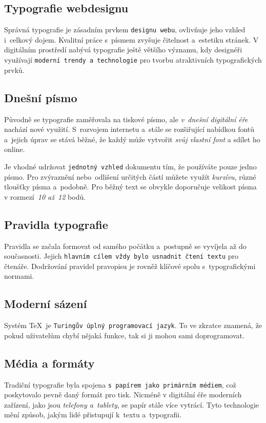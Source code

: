 \documentclass[a4paper, 11pt]{article}
\begin{document}
\subsection{Typografie webdesignu}
Správná typografie je zásadním prvkem \texttt{designu webu}, ovlivňuje jeho vzhled i~celkový dojem. Kvalitní práce s~písmem zvyšuje čitelnost a~estetiku stránek. V digitálním prostředí nabývá typografie ještě většího významu, kdy designéři využívají \texttt{moderní trendy a~technologie} pro tvorbu atraktivních typografických prvků.\cite{FinkoTypografieWebdesign}

\subsection{Dnešní písmo}
Původně se typografie zaměřovala na tiskové písmo, ale \emph{v~dnešní digitální éře} nachází nové využití. S~rozvojem internetu a~stále se rozšiřující nabídkou fontů a~jejich úprav se stává běžné, že každý může vytvořit \emph{svůj vlastní font} a sdílet ho online.\cite{Nova2018}

Je vhodné udržovat \texttt{jednotný vzhled} dokumentu tím, že používáte pouze jedno písmo. Pro zvýraznění nebo~odlišení určitých částí můžete využít \emph{kurzívu}, různé tloušťky písma a~podobně. Pro běžný text se obvykle doporučuje velikost písma v rozmezí~\emph{10 až~12} bodů.\cite{FriesenPat2010TPoT}


\subsection{Pravidla typografie}
Pravidla se začala formovat od samého počátku a~postupně se vyvíjela až do současnosti. Jejich \texttt{hlavním cílem vždy bylo usnadnit čtení textu} pro čtenáře. Dodržování pravidel pravopisu je rovněž klíčové spolu s~typografickými normami.\cite{StudijniOporaTypografie2012}

\subsection{Moderní sázení}
Systém \TeX~je \texttt{Turingův úplný programovací jazyk}. To ve zkratce znamená, že pokud uživatelům chybí nějaká funkce, tak si ji mohou sami doprogramovat.\cite{SyropoulosApostolos2004TXaD}

\subsection{Média a formáty}
Tradiční typografie byla spojena \texttt{s~papírem jako primárním médiem}, což poskytovalo pevně daný formát pro tisk. Nicméně v digitální éře moderních zařízení, jako jsou \emph{telefony a~tablety}, se papír stále více vytrácí. Tyto technologie mění způsob, jakým lidé přistupují k~textu a~typografii.\cite{Jirasek2016thesis}
\end{document}
